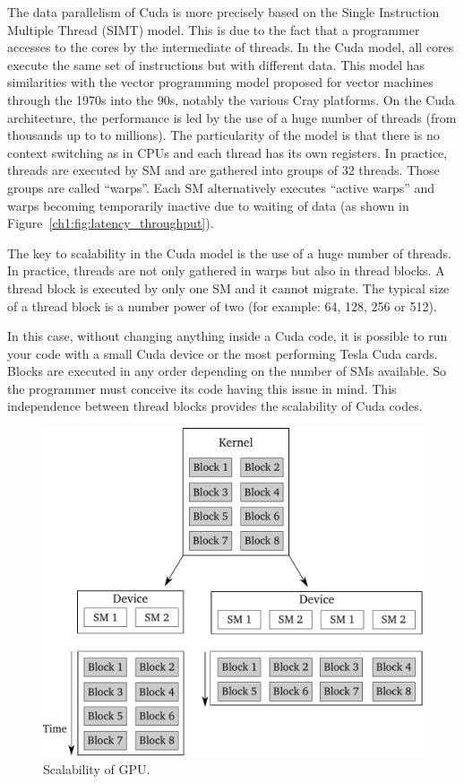 The data parallelism  of Cuda is more precisely based  on the Single Instruction
Multiple Thread (SIMT) model. This is due to the fact that a programmer accesses
to  the cores  by the  intermediate of  threads. In  the Cuda  model,  all cores
execute the  same set of  instructions but with  different data. This  model has
similarities with the vector programming  model proposed for vector machines through
the  1970s into  the  90s, notably  the  various Cray  platforms.   On the  Cuda
architecture, the  performance is  led by the  use of  a huge number  of threads
(from thousands up to  to millions). The particularity of the  model is that there
is no  context switching as in  CPUs and each  thread has its own  registers. In
practice,  threads  are executed  by  SM  and are  gathered  into  groups of  32
threads.  Those  groups  are  called  ``warps''. Each  SM  alternatively  executes
``active warps''  and warps becoming temporarily  inactive due to  waiting of data
(as shown in Figure~\ref{ch1:fig:latency_throughput}).

The key to scalability in the Cuda model is the use of a huge number of threads.
In practice, threads are not only gathered  in warps but also in thread blocks. A
thread block is executed  by only one SM and it cannot  migrate. The typical size of
a thread block is a number power of two (for example: 64, 128, 256 or 512).



In this  case, without changing anything inside  a Cuda code, it  is possible to
run your  code with  a small Cuda  device or  the most performing Tesla  Cuda cards.
Blocks are  executed in any order depending  on the number of  SMs available. So
the  programmer  must  conceive  its  code  having this  issue  in  mind.   This
independence between thread blocks provides the scalability of Cuda codes.

\begin{figure}[b!]
\centerline{\includegraphics[scale=0.65]{Chapters/chapter1/figures/scalability.pdf}}
\caption{Scalability of GPU.}
\label{ch1:fig:scalability}
\end{figure}


